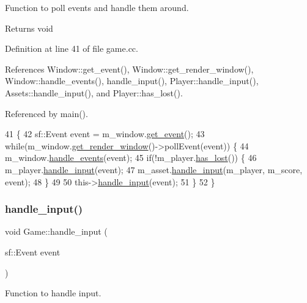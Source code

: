 Function to poll events and handle them around. 

\begin{DoxyReturn}{Returns}
void 
\end{DoxyReturn}


Definition at line 41 of file game.\+cc.



References Window\+::get\+\_\+event(), Window\+::get\+\_\+render\+\_\+window(), Window\+::handle\+\_\+events(), handle\+\_\+input(), Player\+::handle\+\_\+input(), Assets\+::handle\+\_\+input(), and Player\+::has\+\_\+lost().



Referenced by main().


\begin{DoxyCode}
41                          \{
42     sf::Event \textcolor{keyword}{event} = m\_window.\hyperlink{class_window_a878ba53cecdd324dd80274caa0c98a7c}{get\_event}();
43     \textcolor{keywordflow}{while}(m\_window.\hyperlink{class_window_ae921197766adfddd372dcc40879f8b45}{get\_render\_window}()->pollEvent(event)) \{
44         m\_window.\hyperlink{class_window_ae7c221f904b304e507339e6e25ccd018}{handle\_events}(event);
45         \textcolor{keywordflow}{if}(!m\_player.\hyperlink{class_player_a734ead9fd1aa89c2574310425da18dc7}{has\_lost}()) \{
46             m\_player.\hyperlink{class_player_a2a56f0d2037a44c56934c4faac06f54d}{handle\_input}(event);
47             m\_asset.\hyperlink{class_assets_aab62425b0c76418a434cccac038821c4}{handle\_input}(m\_player, m\_score, event);
48         \}
49         
50         this->\hyperlink{class_game_af7895911bb1509fbb33cc1b979c852b8}{handle\_input}(event);
51     \}
52 \}
\end{DoxyCode}
\mbox{\label{class_game_af7895911bb1509fbb33cc1b979c852b8}} 
\subsubsection{\texorpdfstring{handle\+\_\+input()}{handle\_input()}}
{\footnotesize\ttfamily void Game\+::handle\+\_\+input (\begin{DoxyParamCaption}\item[{sf\+::\+Event}]{event }\end{DoxyParamCaption})}



Function to handle input. 


